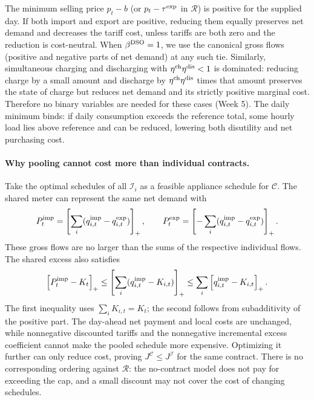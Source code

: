 \documentclass[10pt,a4paper]{article}
\newcommand{\pos}[1]{\left[#1\right]_+}
\newcommand{\Rmod}{\mathcal R}
\newcommand{\Imod}{\mathcal I}
\newcommand{\Cmod}{\mathcal C}
\begin{document}
The minimum selling price $p_t-b$ (or $p_t-\tau^{\rm exp}$ in $\Rmod$) is positive for the supplied day. If both import and export are positive, reducing them equally preserves net demand and decreases the tariff cost, unless tariffs are both zero and the reduction is cost-neutral. When $\beta^{\rm DSO}=1$, we use the canonical gross flows (positive and negative parts of net demand) at any such tie. Similarly, simultaneous charging and discharging with $\eta^{\rm ch}\eta^{\rm dis}<1$ is dominated: reducing charge by a small amount and discharge by $\eta^{\rm ch}\eta^{\rm dis}$ times that amount preserves the state of charge but reduces net demand and its strictly positive marginal cost. Therefore no binary variables are needed for these cases (Week 5). The daily minimum binds: if daily consumption exceeds the reference total, some hourly load lies above reference and can be reduced, lowering both disutility and net purchasing cost.

\paragraph{Why pooling cannot cost more than individual contracts.}
Take the optimal schedules of all $\Imod_i$ as a feasible appliance schedule for $\Cmod$. The shared meter can represent the same net demand with
\begin{equation}
P_t^{\rm imp}=\pos{\sum_i(q_{i,t}^{\rm imp}-q_{i,t}^{\rm exp})},
\qquad
P_t^{\rm exp}=\pos{-\sum_i(q_{i,t}^{\rm imp}-q_{i,t}^{\rm exp})}.
\end{equation}
These gross flows are no larger than the sums of the respective individual flows. The shared excess also satisfies
\begin{equation}
\pos{P_t^{\rm imp}-K_t}
\le \pos{\sum_i(q_{i,t}^{\rm imp}-K_{i,t})}
\le \sum_i\pos{q_{i,t}^{\rm imp}-K_{i,t}} .
\label{eq:dominate}
\end{equation}
The first inequality uses $\sum_i K_{i,t}=K_t$; the second follows from subadditivity of the positive part. The day-ahead net payment and local costs are unchanged, while nonnegative discounted tariffs and the nonnegative incremental excess coefficient cannot make the pooled schedule more expensive. Optimizing it further can only reduce cost, proving $J^{\Cmod}\leq J^{\Imod}$ for the same contract. There is no corresponding ordering against $\Rmod$: the no-contract model does not pay for exceeding the cap, and a small discount may not cover the cost of changing schedules.
\end{document}
